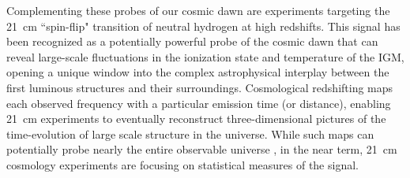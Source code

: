 \documentclass[twocolumn,numberedappendix]{emulateapj} \shorttitle{New Limits on the 21 cm Power Spectrum at $z=8.4$}
\begin{document}
Complementing these probes of our cosmic dawn are experiments targeting
the 21~cm ``spin-flip" transition of neutral hydrogen at high redshifts.
This signal has been recognized as a potentially powerful probe
of the cosmic dawn \citep{pritchard_loeb2012,morales_wyithe2010,furlanetto_et_al2006} that can reveal
large-scale fluctuations in the ionization state and temperature of the IGM, opening
a unique window into the complex astrophysical interplay between the first luminous
structures and their surroundings.
Cosmological redshifting maps 
each observed frequency with a particular emission time (or distance), enabling 21~cm experiments 
to eventually reconstruct 
three-dimensional pictures of the time-evolution of large scale structure in the universe. 
While such maps can potentially probe nearly the entire observable universe \citep{mao_et_al2008},
in the near term, 21~cm cosmology experiments are focusing on statistical measures
of the signal.

\end{document}
